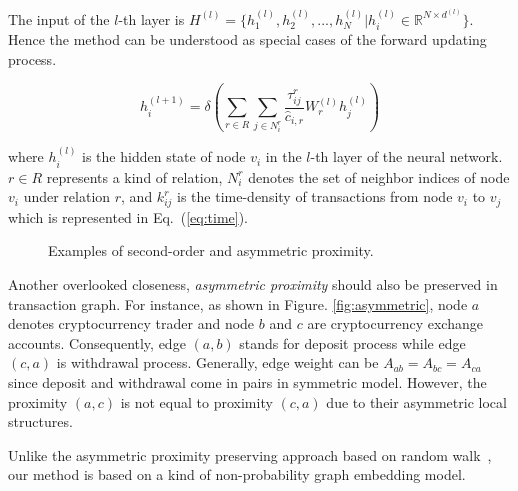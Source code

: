  The input of the $l$-th layer is $H^{(l)}=\{h_1^{(l)},h_2^{(l)},...,h_N^{(l)}|h_i^{(l)}\in \mathbb{R}^{N \times d^{(l)}}\}$. Hence the method can be understood as special cases of the forward updating process.

\begin{equation}
h_i^{(l+1)}=\delta(\sum_{r\in R} \sum_{j \in N_i^r} \frac{\tau_{ij}^r}{\hat c_{i,r}}W_r^{(l)}h_j^{(l)})
\end{equation}

\noindent where $h_i^{(l)}$ is the hidden state of node $v_i$ in the $l$-th layer of the neural network. $r \in R$ represents a kind of relation, $N_i^r$ denotes the set of neighbor indices of node $v_i$ under relation $r$, and $k_{ij}^r$ is the time-density of transactions from node $v_i$ to $v_j$ which is represented in Eq.~(\ref{eq:time}).



\begin{figure}[htbp]
	\centering
	\caption{Examples of second-order and asymmetric proximity.}

\end{figure}


Another overlooked closeness, \emph{asymmetric proximity} should also be preserved in transaction graph. For instance, as shown in Figure. \ref{fig:asymmetric}, node $a$ denotes cryptocurrency trader and node $b$ and $c$ are cryptocurrency exchange accounts. Consequently, edge $(a,b)$ stands for deposit process while edge $(c,a)$ is withdrawal process. Generally, edge weight can be $A_{ab}=A_{bc}=A_{ca}$ since deposit and withdrawal come in pairs in symmetric model. However, the proximity $(a,c)$ is not equal to proximity $(c,a)$ due to their asymmetric local structures.

Unlike the asymmetric proximity preserving approach based on random walk~\cite{zhou2017scalable}, our method is based on a kind of non-probability graph embedding model.
 
